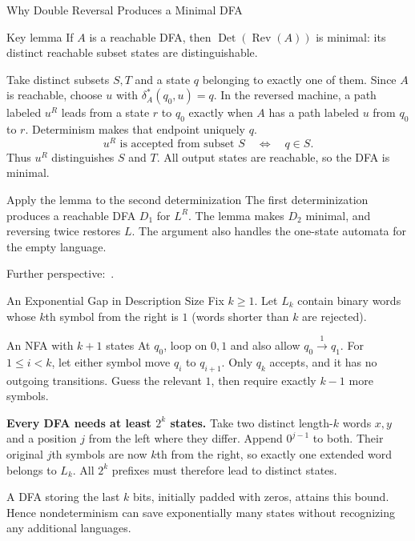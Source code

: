 \documentclass[10pt]{beamer}
\begin{document}
\begin{frame}{Why Double Reversal Produces a Minimal DFA}
  \small
  \begin{block}{Key lemma}
    If $A$ is a reachable DFA, then $\operatorname{Det}(\operatorname{Rev}(A))$
    is minimal: its distinct reachable subset states are distinguishable.
  \end{block}
  \pause
  Take distinct subsets $S,T$ and a state $q$ belonging to exactly one of them.
  Since $A$ is reachable, choose $u$ with $\delta_A^*(q_0,u)=q$.
  In the reversed machine, a path labeled $u^R$ leads from a state $r$
  to $q_0$ exactly when $A$ has a path labeled $u$ from $q_0$ to $r$.
  Determinism makes that endpoint uniquely $q$.
  \[
    u^R\text{ is accepted from subset }S\quad\Longleftrightarrow\quad q\in S.
  \]
  Thus $u^R$ distinguishes $S$ and $T$. All output states are reachable,
  so the DFA is minimal.
  \pause
  \begin{block}{Apply the lemma to the second determinization}
    The first determinization produces a reachable DFA $D_1$ for $L^R$.
    The lemma makes $D_2$ minimal, and reversing twice restores $L$.
    The argument also handles the one-state automata for the empty language.
  \end{block}
  Further perspective:~\cite{brzozowski-duality}.
\end{frame}

\begin{frame}{An Exponential Gap in Description Size}
  \small
  Fix $k\ge1$. Let $L_k$ contain binary words whose $k$th symbol from the
  right is $1$ (words shorter than $k$ are rejected).
  \begin{block}{An NFA with $k+1$ states}
    At $q_0$, loop on $0,1$ and also allow $q_0\xrightarrow{1}q_1$.
    For $1\le i<k$, let either symbol move $q_i$ to $q_{i+1}$.
    Only $q_k$ accepts, and it has no outgoing transitions. Guess the
    relevant $1$, then require exactly $k-1$ more symbols.
  \end{block}
  \pause
  \textbf{Every DFA needs at least $2^k$ states.} Take two distinct length-$k$
  words $x,y$ and a position $j$ from the left where they differ. Append
  $0^{j-1}$ to both. Their original $j$th symbols are now $k$th from the
  right, so exactly one extended word belongs to $L_k$.
  All $2^k$ prefixes must therefore lead to distinct states.
  \pause
  \par\smallskip
  A DFA storing the last $k$ bits, initially padded with zeros, attains this
  bound. Hence nondeterminism can save exponentially many states without
  recognizing any additional languages.
\end{frame}
\end{document}
